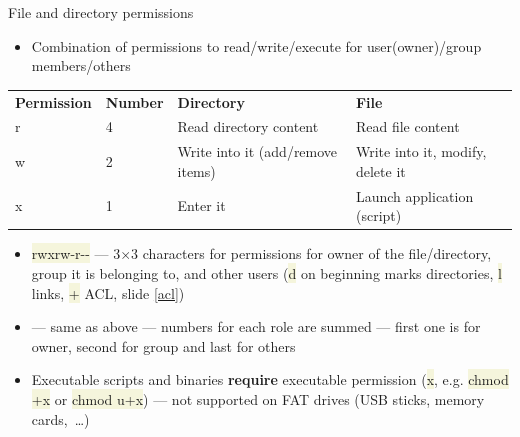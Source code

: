 \documentclass[compress, ucs, xelatex, 11pt, xcolor=svgnames, aspectratio=169,
	hyperref={
		bookmarks=true,
		unicode=true,
		colorlinks=true,
		pdftitle={Linux, command line and MetaCentrum},
		plainpages=false,
		pdfauthor={Vojtech Zeisek},
		pdfsubject={Course about use of Linux command line, writing shell scripts and using MetaCentrum of CESNET},
		pdfcreator={XeLaTeX},
		pdfkeywords={Linux, GNU, BASH, shell, command line, MetaCentrum},
		linkcolor=DarkRed, %
		anchorcolor=DarkBlue, %
		citecolor=Indigo, %
		filecolor=NavyBlue, %
		menucolor=DarkMagenta, %
		urlcolor=DarkBlue, %
		pdftex},
	url={hyphens, lowtilde} %
	]{beamer}
\renewcommand{\texttt}[1]{\colorbox{Beige}{{\ttfamily #1}}}
\begin{document}
\begin{frame}{File and directory permissions}
	\label{permissions}
	\begin{itemize}
		\item Combination of permissions to read/write/execute for user(owner)/group members/others
	\end{itemize}
	\begin{center}
		\begin{tabular}{llll}
			\textbf{Permission} & \textbf{Number} & \textbf{Directory} & \textbf{File}\\
			r & 4 & Read directory content & Read file content\\
			w & 2 & Write into it (add/remove items) & Write into it, modify, delete it\\
			x & 1 & Enter it & Launch application (script)
		\end{tabular}
	\end{center}
	\begin{itemize}
		\item \texttt{rwxrw-r-{-}} --- 3$\times$3 characters for permissions for owner of the file/directory, group it is belonging to, and other users (\texttt{d} on beginning marks directories, \texttt{l} links, \texttt{+} ACL, slide \ref{acl})
		\item \texttt{764} --- same as above --- numbers for each role are summed --- first one is for owner, second for group and last for others
		\item Executable scripts and binaries \textbf{require} executable permission (\texttt{x}, e.g. \texttt{chmod +x} or \texttt{chmod u+x}) --- not supported on FAT drives (USB sticks, memory cards,~\ldots)
	\end{itemize}
\end{frame}
\end{document}

